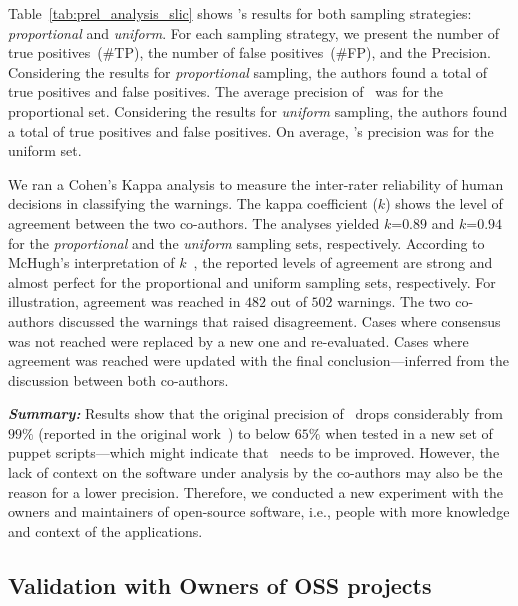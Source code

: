 Table~\ref{tab:prel_analysis_slic} shows \slic{}'s results for both 
sampling strategies:
\textit{proportional} and \textit{uniform}. 
For each sampling strategy, we present the number of true positives~(\#TP), 
the number of false positives~(\#FP), 
and the Precision. Considering the results for \textit{proportional} 
sampling, the authors found a total of \tpProportionalSample{} 
true positives and \fpProportionalSample{} false positives. 
The average precision of \slic\ was \precTotalProportional{} for the 
proportional set. Considering the results for \textit{uniform} sampling, 
the authors found a total of \tpUniformSample{} true 
positives and \fpUniformSample{} false positives. 
On average, \slic's precision was \precTotalUniform{} for the uniform set. 

We ran a Cohen's Kappa analysis to measure the inter-rater reliability of human 
decisions in classifying the warnings. The kappa coefficient ($k$) shows the level 
of agreement between the two co-authors. The analyses yielded $k$=$0.89$ 
and $k$=$0.94$ for the \textit{proportional} and the \textit{uniform} sampling 
sets, respectively. According to McHugh's interpretation of $k$~\cite{mchugh2012interrater}, 
the reported levels of agreement 
are strong and almost perfect for the proportional and uniform sampling sets, respectively. 
For illustration, agreement was reached in $482$ out of $502$ warnings. 
The two co-authors discussed the warnings that 
raised disagreement. Cases where 
consensus was not reached were replaced by a new one and re-evaluated.
Cases where agreement was reached were updated with the final 
conclusion---inferred from the discussion between both co-authors. 

\textit{\textbf{Summary:}} Results show that the original precision of \slic\ drops 
considerably from $99\%$ (reported in the original work~\cite{8812041}) to below $65\%$ 
when tested in a new set of puppet scripts---which might indicate that \slic\ needs to 
be improved. However, the lack of context on the software under analysis by the co-authors 
may also be the reason for a lower precision. Therefore, we conducted a new experiment
with the owners and maintainers of open-source software, i.e., people with more knowledge 
and context of the applications.



\subsection{Validation with Owners of OSS projects}\label{subsec:maintainers}

